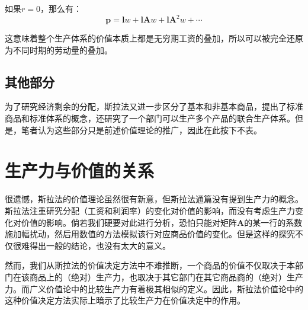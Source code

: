 如果$r=0$，那么有：
\begin{equation}
    \bm{p} = \bm{l}w + \bm{l}\bm{A}w + \bm{l}\bm{A}^2w + \cdots
\end{equation}

这意味着整个生产体系的价值本质上都是无穷期工资的叠加，所以可以被完全还原为不同时期的劳动量的叠加。

\subsection{其他部分}

为了研究经济剩余的分配，斯拉法又进一步区分了基本和非基本商品，提出了标准商品和标准体系的概念，还研究了一个部门可以生产多个产品的联合生产体系。但是，笔者认为这些部分只是前述价值理论的推广，因此在此按下不表。

\section{生产力与价值的关系}

很遗憾，斯拉法的价值理论虽然很有新意，但斯拉法通篇没有提到生产力的概念。斯拉法注重研究分配（工资和利润率）的变化对价值的影响，而没有考虑生产力变化对价值的影响。倘若我们硬要对此进行分析，恐怕只能对矩阵$\bm{A}$的某一行的系数施加幅扰动，然后用数值的方法模拟该行对应商品价值的变化。但是这样的探究不仅很难得出一般的结论，也没有太大的意义。

然而，我们从斯拉法的价值决定方法中不难推断，一个商品的价值不仅取决于本部门在该商品上的（绝对）生产力，也取决于其它部门在其它商品商的（绝对）生产力。而广义价值论中的比较生产力有着极其相似的定义。因此，斯拉法价值论中的这种价值决定方法实际上暗示了比较生产力在价值决定中的作用。